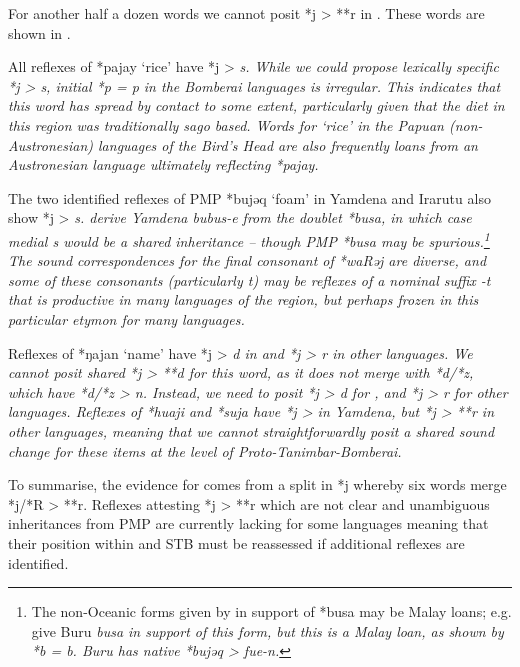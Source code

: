 For another half a dozen words we cannot posit *j > **r in .
These words are shown in .

All reflexes of *pajay ‘rice’ have *j > \it{s}.
While we could propose lexically specific *j > \it{s},
initial *p = \it{p} in the Bomberai languages is irregular.
This indicates that this word has spread by contact to some extent,
particularly given that the diet in this region was traditionally sago based.
Words for ‘rice’ in the Papuan (non-Austronesian) languages of
the Bird’s Head are also frequently loans from an Austronesian
language ultimately reflecting *pajay.

The two identified reflexes of PMP *bujəq ‘foam’ in Yamdena
and Irarutu also show *j > \it{s.} \citet{BlustTrussel2020} derive
Yamdena \it{bu{\tl}bus-e} from the doublet *busa,
in which case medial \it{s} would be a shared inheritance -- though
PMP *busa may be spurious.\footnote{
		The non-Oceanic forms given by \citet{BlustTrussel2020} in support
		of *busa may be Malay loans; e.g.
		\citet{BlustTrussel2020} give Buru \it{busa} in support of this
		form, but this is a Malay loan,
		as shown by *b = \it{b.} Buru has native *bujəq > \it{fue-n.}}
The sound correspondences for the final consonant of *waRəj
are diverse, and some of these consonants (particularly \it{t}) may be reflexes
of a nominal suffix \it{-t} that is productive in many languages
of the region, but perhaps frozen in this particular etymon for many languages.

Reflexes of *ŋajan ‘name’ have *j > \it{d} in  and *j > \it{r} in other languages.
We cannot posit shared *j > **d for this word,
as it does not merge with  *d/*z,
which have *d/*z > \it{n}.
Instead, we need to posit *j > \it{d} for ,
and *j > \it{r} for other languages.
Reflexes of *huaji and *suja have *j > {\0} in Yamdena,
but *j > **r in other languages,
meaning that we cannot straightforwardly posit a shared sound
change for these items at the level of Proto-Tanimbar-Bomberai.

To summarise, the evidence for  comes
from a split in *j whereby six words merge *j/*R > **r.
Reflexes attesting *j > **r which are not clear and
unambiguous inheritances from PMP are currently lacking for some
 languages meaning that their position
within  and STB must
be reassessed if additional reflexes are identified.
